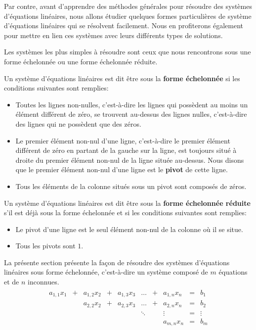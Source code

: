 \documentclass[]{book}
\providecommand{\tightlist}{%
  \setlength{\itemsep}{0pt}\setlength{\parskip}{0pt}}
\theoremstyle{definition}
\theoremstyle{definition}
\theoremstyle{definition}
\theoremstyle{remark}
\let\BeginKnitrBlock\begin \let\EndKnitrBlock\end
\begin{document}
Par contre, avant d'apprendre des méthodes générales pour résoudre des systèmes d'équations linéaires, nous allons étudier quelques formes particulières de système d'équations linéaires qui se résolvent facilement. Nous en profiterons également pour mettre en lien ces systèmes avec leurs différents types de solutions.

Les systèmes les plus simples à résoudre sont ceux que nous rencontrons sous une forme échelonnée ou une forme échelonnée réduite.

\BeginKnitrBlock{definition}
\protect\hypertarget{def:unnamed-chunk-14}{}{\label{def:unnamed-chunk-14} }Un système d'équations linéaires est dit être sous la \textbf{forme échelonnée} si les conditions suivantes sont remplies:

\begin{itemize}
\tightlist
\item
  Toutes les lignes non-nulles, c'est-à-dire les lignes qui possèdent au moins un élément différent de zéro, se trouvent au-dessus des lignes nulles, c'est-à-dire des lignes qui ne possèdent que des zéros.
\item
  Le premier élément non-nul d'une ligne, c'est-à-dire le premier élément différent de zéro en partant de la gauche sur la ligne, est toujours situé à droite du premier élément non-nul de la ligne située au-dessus. Nous disons que le premier élément non-nul d'une ligne est le \textbf{pivot} de cette ligne.
\item
  Tous les éléments de la colonne situés sous un pivot sont composés de zéros.
\end{itemize}

Un système d'équations linéaires est dit être sous la \textbf{forme échelonnée réduite} s'il est déjà sous la forme échelonnée et si les conditions suivantes sont remplies:

\begin{itemize}
\tightlist
\item
  Le pivot d'une ligne est le seul élément non-nul de la colonne où il se situe.
\item
  Tous les pivots sont \(1\).
\end{itemize}
\EndKnitrBlock{definition}

La présente section présente la façon de résoudre des systèmes d'équations linéaires sous forme échelonnée, c'est-à-dire un système composé de \(m\) équations et de \(n\) inconnues.
\begin{align*}
\begin{array}{cccccccccc}
a_{1,1}x_1 & +& a_{1,2}x_2 & +&  a_{1,3}x_3 & \ldots & +&  a_{1,n}x_n & =& b_1  \\
        & & a_{2,2}x_2 & +&  a_{2,3}x_3 & \ldots & +& a_{2,n}x_n & =& b_2  \\
        & &         & &    & \ddots & & \vdots & =& \vdots   \\
       & &         & &          &        & & a_{m,n}x_n & =& b_m
\end{array}
\end{align*}
\end{document}
